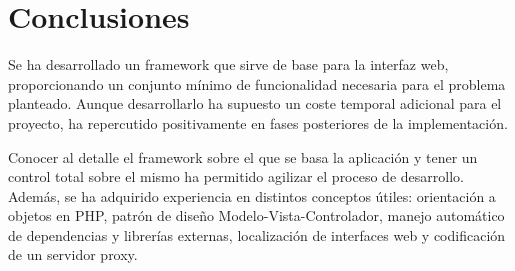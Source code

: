 \section{Conclusiones\label{extra:mvc:conclusiones}}

Se ha desarrollado un \gls{framework} que sirve de base para la interfaz web, proporcionando un conjunto mínimo de funcionalidad necesaria para el problema planteado. Aunque desarrollarlo ha supuesto un coste temporal adicional para el proyecto, ha repercutido positivamente en fases posteriores de la implementación.

Conocer al detalle el \gls{framework} sobre el que se basa la aplicación y tener un control total sobre el mismo ha permitido agilizar el proceso de desarrollo. Además, se ha adquirido experiencia en distintos conceptos útiles: orientación a objetos en \gls{PHP}, patrón de diseño Modelo-Vista-Controlador, manejo automático de dependencias y librerías externas, localización de interfaces web y codificación de un servidor \gls{proxy}.